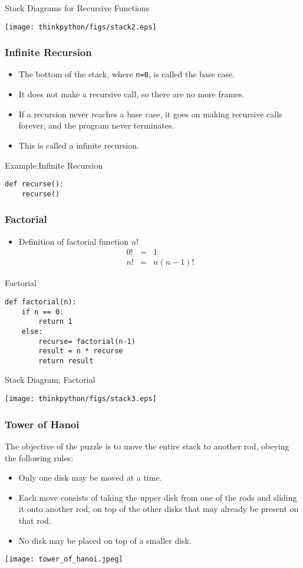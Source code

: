 \documentclass{beamer}
\begin{document}
\begin{frame}{Stack Diagrams for Recursive Functions}
\centerline{\texttt{[image: thinkpython/figs/stack2.eps]}}
\end{frame}

\begin{frame}[fragile]
\frametitle{Infinite Recursion}
\begin{itemize}
\item The bottom of the stack, where \texttt{n=0}, is
called the \alert{base case}. 
\item It does not make a recursive call, so
there are no more frames.
\item If a recursion \alert{never reaches a base case}, it goes on making
recursive calls forever, and the program \alert{never} terminates. 
\item This is called a \alert{infinite recursion}.
\end{itemize}
\begin{block}{Example:Infinite Recursion}
\small
\begin{verbatim}
def recurse():
    recurse()
\end{verbatim}
\end{block}
\end{frame}
\begin{frame}[fragile]
\frametitle{Factorial}
\begin{itemize}
\item Definition of factorial function $n!$
\begin{eqnarray*}
0! & =& 1 \\
n! &=& n (n-1)!
\end{eqnarray*}
\end{itemize}
\begin{block}{Factorial}
\small
\begin{verbatim}
def factorial(n):
    if n == 0:
        return 1
    else:
        recurse= factorial(n-1)
        result = n * recurse
        return result
\end{verbatim}
\end{block}
\end{frame}
\begin{frame}{Stack Diagram: Factorial}
\centerline{\texttt{[image: thinkpython/figs/stack3.eps]}}

\end{frame}
\begin{frame}[fragile]
\frametitle{Tower of Hanoi}
The objective of the puzzle is to move the entire stack to another rod, obeying the following rules:
\begin{itemize}
\item Only one disk may be moved at a time.
\item Each move consists of taking the upper disk from one of the rods and sliding it onto another rod, on top of the other disks that may already be present on that rod.
\item No disk may be placed on top of a smaller disk.
\end{itemize}
\centerline{\texttt{[image: tower\_of\_hanoi.jpeg]}}
\end{frame}
\end{document}
